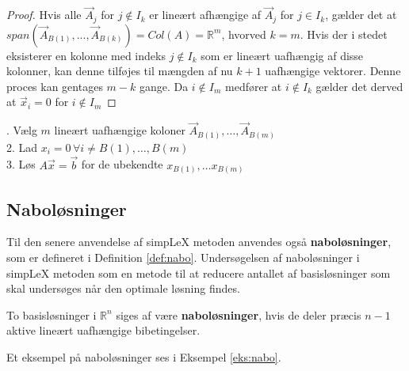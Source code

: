 \begin{proof}
Hvis alle $\vec{A}_j$ for $j \notin I_k$ er lineært afhængige af $\vec{A}_j$ for $j \in I_k$, gælder det at $span\left( \vec{A}_{B(1)},...,\vec{A}_{B(k)} \right)=Col(A)=\mathds{R}^m$, hvorved $k=m$. 
Hvis der i stedet eksisterer en kolonne med indeks $j \notin I_k$ som er lineært uafhængig af disse kolonner, kan denne tilføjes til mængden af nu $k+1$ uafhængige vektorer. Denne proces kan gentages $m-k$ gange. Da $i \notin I_m$ medfører at $i \notin I_k$ gælder det derved at $\vec{x}_i =0$ for $i \notin I_m$
\end{proof}

\begin{pro}
. Vælg $m$ lineært uafhængige koloner $\vec{A}_{B(1)},\dots,\vec{A}_{B(m)}$\\
2. Lad $x_i=0 \,\forall i\neq B(1),\dots,B(m)$\\
3. Løs $A\vec{x}=\vec{b}$ for de ubekendte $x_{B(1)},\dots x_{B(m)}$
\end{pro}

\begin{comment}
Der mangler bare generelt bindetekst mellem sætninger, fra at korollar 6.12 skal introduceres til at kapitlet skal afsluttes og føres videre til naboløsninger
\end{comment}

\subsection{Naboløsninger}

Til den senere anvendelse af simpLeX metoden anvendes også \textbf{naboløsninger}, som er defineret i Definition \ref{def:nabo}. Undersøgelsen af naboløsninger i simpLeX metoden som en metode til at reducere antallet af basisløsninger som skal undersøges når den optimale løsning findes. %

\begin{defn}[Naboløsninger]
	To basisløsninger i $\mathds{R}^n$ siges af være \textbf{naboløsninger}, hvis de deler præcis $n-1$ aktive lineært uafhængige bibetingelser.
	\label{def:nabo}
\end{defn}

Et eksempel på naboløsninger ses i Eksempel \ref{eks:nabo}.

